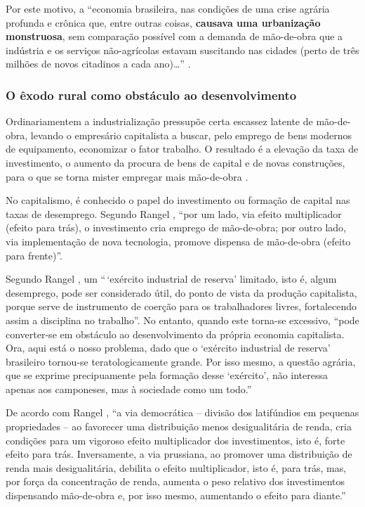\documentclass[
	12pt,				%
	oneside,			%
	a4paper,			%
	chapter=TITLE,		%
	section=TITLE,		%
	english,			%
	brazil				%
	]{abntex2}
\begin{document}
Por este motivo, a ``economia brasileira, nas condições de uma crise
agrária profunda e crônica que, entre outras coisas, \textbf{causava uma
urbanização monstruosa}, sem comparação possível com a demanda de
mão-de-obra que a indústria e os serviços não-agrícolas estavam
suscitando nas cidades (perto de três milhões de novos citadinos a cada
ano)\ldots{}'' \autocite[134]{rangel1986b}.

\subsubsection{O êxodo rural como obstáculo ao
desenvolvimento}\label{o-uxeaxodo-rural-como-obstuxe1culo-ao-desenvolvimento}
\begin{citacao}
Ordinariamentem a industrialização pressupõe certa escassez latente de 
mão-de-obra, levando o empresário capitalista a buscar, pelo emprego de bens
modernos de equipamento, economizar o fator trabalho. O resultado é a elevação 
da taxa de investimento, o aumento da procura de bens de capital e de novas
construções, para o que se torna mister empregar mais mão-de-obra 
\cite[p.~43]{rangel1962}.
\end{citacao}
No capitalismo, é conhecido o papel do investimento ou formação de
capital nas taxas de desemprego. Segundo Rangel
\autocite*[156]{rangel1988}, ``por um lado, via efeito multiplicador
(efeito para trás), o investimento cria emprego de mão-de-obra; por
outro lado, via implementação de nova tecnologia, promove dispensa de
mão-de-obra (efeito para frente)''.

Segundo Rangel \autocite[142]{rangel1986c}, um ``\,`exército industrial
de reserva' limitado, isto é, algum desemprego, pode ser considerado
útil, do ponto de vista da produção capitalista, porque serve de
instrumento de coerção para os trabalhadores livres, fortalecendo assim
a disciplina no trabalho''. No entanto, quando este torna-se excessivo,
``pode converter-se em obstáculo ao desenvolvimento da própria economia
capitalista. Ora, aqui está o nosso problema, dado que o `exército
industrial de reserva' brasileiro tornou-se teratologicamente grande.
Por isso mesmo, a questão agrária, que se exprime precipuamente pela
formação desse `exército', não interessa apenas aos camponeses, mas à
sociedade como um todo.''

De acordo com Rangel \autocite*[156]{rangel1988}, ``a via democrática --
divisão dos latifúndios em pequenas propriedades -- ao favorecer uma
distribuição menos desigualitária de renda, cria condições para um
vigoroso efeito multiplicador dos investimentos, isto é, forte efeito
para trás. Inversamente, a via prussiana, ao promover uma distribuição
de renda mais desigualitária, debilita o efeito multiplicador, isto é,
para trás, mas, por força da concentração de renda, aumenta o peso
relativo dos investimentos dispensando mão-de-obra e, por isso mesmo,
aumentando o efeito para diante.''
\end{document}
